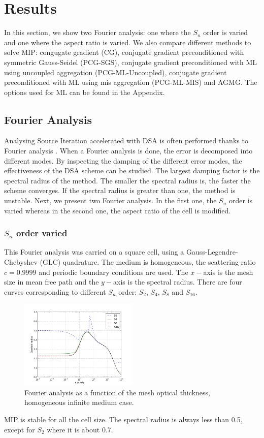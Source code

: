 \section{Results} \label{sec_res}
In this section, we show two Fourier analysis: one where the $S_n$ order is
varied and one where the aspect ratio is varied. We also compare different
methods to solve MIP: congugate gradient (CG), conjugate gradient
preconditioned with symmetric Gauss-Seidel (PCG-SGS), conjugate gradient
preconditioned with ML using uncoupled aggregation (PCG-ML-Uncoupled),
conjugate gradient preconditioned with ML using mis aggregation (PCG-ML-MIS)
and AGMG. The options used for ML can be found in the Appendix.
\subsection{Fourier Analysis}
Analysing Source Iteration accelerated with DSA is often performed thanks to
Fourier analysis \cite{larsen_dsa,consistent_p1}. When a Fourier analysis is
done, the error is decomposed into different modes. By inspecting the damping of
the different error modes, the effectiveness of the DSA scheme can be studied.
The largest damping factor is the spectral radius of the method. The smaller
the spectral radius is, the faster the scheme converges. If the spectral
radius is greater than one, the method is unstable. Next, we present two Fourier 
analysis. In the first one, the $S_n$ order is varied whereas in the second one, 
the aspect ratio of the cell is modified.
\subsubsection{$S_n$ order varied}
This Fourier analysis was carried on a square cell, using a
Gauss-Legendre-Chebyshev (GLC) quadrature. The medium is homogeneous, the scattering
ratio $c=0.9999$ and periodic boundary conditions are used. The $x-$axis is the mesh
size in mean free path and the $y-$axis is the spectral radius. There are four
curves corresponding to different $S_n$ order: $S_2$, $S_4$, $S_8$ and
$S_{16}$.
\begin{figure}[H]
\centering
\includegraphics[width=0.5\textwidth]{sn_order_9999}
\caption{Fourier analysis as a function of the mesh optical thickness,
homogeneous infinite medium case.}
\end{figure}
MIP is stable for all the cell size. The spectral radius is always less than
0.5, except for $S_2$ where it is about 0.7.
